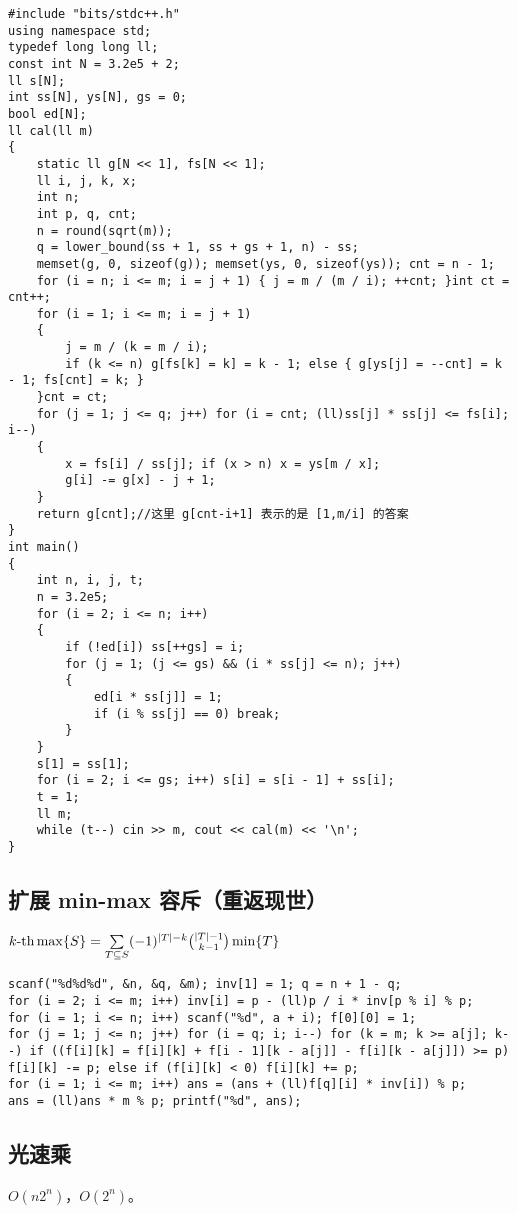 \documentclass[12pt]{ctexart}
\begin{document}
\begin{lstlisting}
#include "bits/stdc++.h"
using namespace std;
typedef long long ll;
const int N = 3.2e5 + 2;
ll s[N];
int ss[N], ys[N], gs = 0;
bool ed[N];
ll cal(ll m)
{
	static ll g[N << 1], fs[N << 1];
	ll i, j, k, x;
	int n;
	int p, q, cnt;
	n = round(sqrt(m));
	q = lower_bound(ss + 1, ss + gs + 1, n) - ss;
	memset(g, 0, sizeof(g)); memset(ys, 0, sizeof(ys)); cnt = n - 1;
	for (i = n; i <= m; i = j + 1) { j = m / (m / i); ++cnt; }int ct = cnt++;
	for (i = 1; i <= m; i = j + 1)
	{
		j = m / (k = m / i);
		if (k <= n) g[fs[k] = k] = k - 1; else { g[ys[j] = --cnt] = k - 1; fs[cnt] = k; }
	}cnt = ct;
	for (j = 1; j <= q; j++) for (i = cnt; (ll)ss[j] * ss[j] <= fs[i]; i--)
	{
		x = fs[i] / ss[j]; if (x > n) x = ys[m / x];
		g[i] -= g[x] - j + 1;
	}
	return g[cnt];//这里 g[cnt-i+1] 表示的是 [1,m/i] 的答案
}
int main()
{
	int n, i, j, t;
	n = 3.2e5;
	for (i = 2; i <= n; i++)
	{
		if (!ed[i]) ss[++gs] = i;
		for (j = 1; (j <= gs) && (i * ss[j] <= n); j++)
		{
			ed[i * ss[j]] = 1;
			if (i % ss[j] == 0) break;
		}
	}
	s[1] = ss[1];
	for (i = 2; i <= gs; i++) s[i] = s[i - 1] + ss[i];
	t = 1;
	ll m;
	while (t--) cin >> m, cout << cal(m) << '\n';
}
\end{lstlisting}

\subsection{扩展 min-max 容斥（重返现世）}

$k\text{-th}\max\{S\}=\sum\limits_{T\subseteq S}(-1)^{|T|-k}\tbinom{|T|-1}{k-1}\min\{T\}$

\begin{lstlisting}
scanf("%d%d%d", &n, &q, &m); inv[1] = 1; q = n + 1 - q;
for (i = 2; i <= m; i++) inv[i] = p - (ll)p / i * inv[p % i] % p;
for (i = 1; i <= n; i++) scanf("%d", a + i); f[0][0] = 1;
for (j = 1; j <= n; j++) for (i = q; i; i--) for (k = m; k >= a[j]; k--) if ((f[i][k] = f[i][k] + f[i - 1][k - a[j]] - f[i][k - a[j]]) >= p) f[i][k] -= p; else if (f[i][k] < 0) f[i][k] += p;
for (i = 1; i <= m; i++) ans = (ans + (ll)f[q][i] * inv[i]) % p;
ans = (ll)ans * m % p; printf("%d", ans);

\end{lstlisting}

\subsection{光速乘}

$O(n2^n)$，$O(2^n)$。
\end{document}
